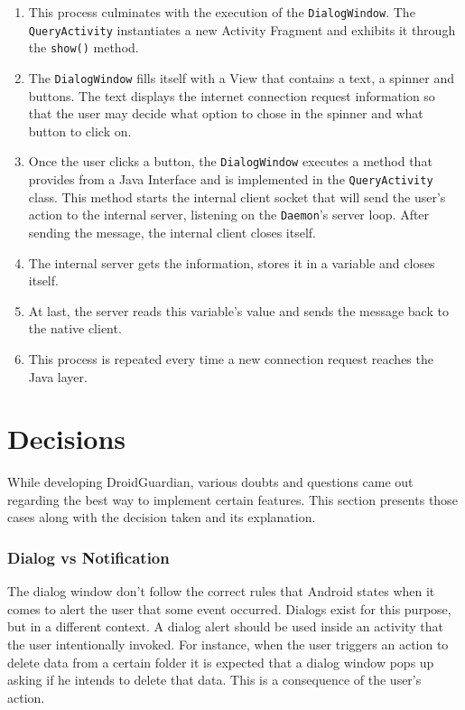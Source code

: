 \begin{enumerate}
\item This process culminates with the execution of the \texttt{DialogWindow}. The \texttt{QueryActivity} instantiates a new Activity Fragment and exhibits it through the \texttt{show()} method.
\item The \texttt{DialogWindow} fills itself with a View that contains a text, a spinner and buttons. The text displays the internet connection request information so that the user may decide what option to chose in the spinner and what button to click on.
\item Once the user clicks a button, the \texttt{DialogWindow} executes a method that provides from a Java Interface and is implemented in the \texttt{QueryActivity} class. This method starts the internal client socket that will send the user's action to the internal server, listening on the \texttt{Daemon}'s server loop. After sending the message, the internal client closes itself.
\item The internal server gets the information, stores it in a variable and closes itself.
\item At last, the server reads this variable's value and sends the message back to the native client.
\item This process is repeated every time a new connection request reaches the Java layer.
\end{enumerate} 

\section{Decisions}

While developing DroidGuardian, various doubts and questions came out regarding the best way to implement certain features. This section presents those cases along with the decision taken and its explanation.

\subsubsection{Dialog vs Notification}

The dialog window don't follow the correct rules that Android states when it comes to alert the user that some event occurred. Dialogs exist for this purpose, but in a different context. A dialog alert should be used inside an activity that the user intentionally invoked. For instance, when the user triggers an action to delete data from a certain folder it is expected that a dialog window pops up asking if he intends to delete that data. This is a consequence of the user's action.

